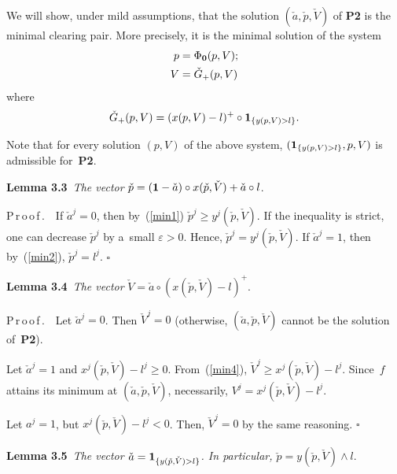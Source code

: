 \begin{multicols}{2}
 We will show, under mild assumptions, that the solution $(\check a, \check p, \check V)$ 
 of {\bf P2} is the minimal clearing pair. More precisely, it is the minimal solution of the system 
\begin{align}
    \label{min_eq1}
    p &= \Phi_{\bf 0} (p, V); \\
    \label{min_eq2}
    V &= \check G_+(p, V)
\end{align}
where 
$$
\check G_+ (p, V) = (x(p,V) - l)^+ \circ {\bf 1}_{\{y(p,V)> l\}}.
$$


Note that  for every solution $( p,  V)$ of the above system, $({\bf 1}_{\{y(p,V)> l\}}, p, V)$ is admissible for~\textbf{P2}.

\smallskip

\noindent
\textbf{Lemma 3.3}\
\textit{The vector} $\check p = ({\bf 1} - \check a) \circ x(\check p, \check V) +  \check a \circ l$.

\smallskip

\noindent
P\,r\,o\,o\,f\,.\ \ If $\check a^j = 0$, then by~(\ref{min1}) $\check p^j \geq y^j(\check p,\check V)$.
 If the inequality is strict, one can decrease $\check p^j$ by a~small $\varepsilon>0$. Hence, 
$\check p^j = y^j(\check p,\check  V)$. If
 $\check a^j = 1$, then by~(\ref{min2}), $\check p^j = l^j$.  \hfill$\square$

\smallskip

\noindent
\textbf{Lemma 3.4}\
\textit{The vector}  $\check V = \check a \circ (x(\check  p,\check  V)-l)^+$.

\smallskip

\noindent
P\,r\,o\,o\,f\,.\ \
  Let $\check a^j = 0$. Then $\check V^j = 0$ (otherwise,  $(\check a, \check p, \check V)$ cannot be the solution of~\textbf{P2}). 

Let $\check a^j = 1$ and $x^j(\check  p,\check  V) - l^j \geq 0$. From~(\ref{min4}), 
$\check V^j \geq x^j(\check  p,\check  V) - l^j$. Since~$f$ attains its minimum at $(\check a, \check p,\check  V)$, necessarily, 
$V^j = x^j(\check  p,\check  V) - l^j$. 

Let $a^j = 1$, but $x^j(\check  p,\check  V) - l^j < 0$. Then, $\check V^j = 0$ by the same reasoning. \hfill$\square$

\smallskip

\noindent
\textbf{Lemma 3.5}\
\textit{The vector $\check a = {\bf 1}_{\{y(\check  p,\check  V) > l \} }$. In particular, $\check p = y(\check  p,\check  V) \wedge l$}.

\pagebreak


\end{multicols}
